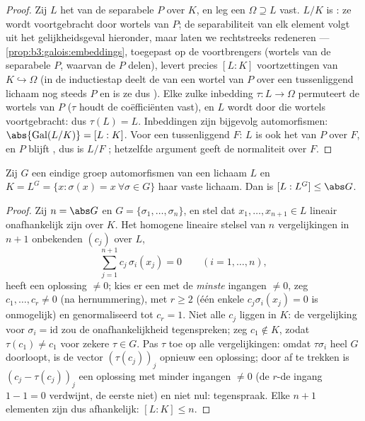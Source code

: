 \begin{proof}
Zij $L$ het  van de separabele $P$ over $K$, en
leg een  $\Omega \supseteq L$ vast. $L/K$
is : ze wordt voortgebracht door wortels van $P$; de
separabiliteit van elk element volgt uit het gelijkheidsgeval
hieronder, maar laten we rechtstreeks redeneren ---
\cref{prop:b3:galois:embeddings}, toegepast op de voortbrengers
(wortels van de separabele $P$, waarvan de  $P$
delen), levert precies $[L:K]$ voortzettingen van $K
\hookrightarrow \Omega$ (in de inductiestap deelt de
 van een wortel van $P$ over een tussenliggend
lichaam nog steeds $P$ en is ze dus ). Elke zulke
inbedding $\tau \colon L \to \Omega$ permuteert de wortels van $P$
($\tau$ houdt de coëfficiënten vast), en $L$ wordt door die
wortels voortgebracht: dus $\tau(L) = L$. Inbeddingen zijn
bijgevolg automorfismen: $\abs{\operatorname{Gal}(L/K)} = [L:K]$.
Voor een tussenliggend $F$: $L$ is ook het  van
$P$ over $F$, en $P$ blijft , dus is $L/F$ ;
hetzelfde argument geeft de normaliteit over $F$.
\end{proof}

\begin{lemma}[Artin]\label{lem:b3:galois:artin}
Zij $G$ een eindige groep automorfismen van een lichaam $L$ en $K
= L^G = \{x : \sigma(x) = x\ \forall\sigma \in G\}$ haar vaste
lichaam. Dan is $[L : L^G] \leq \abs G$.
\end{lemma}

\begin{proof}
Zij $n = \abs G$ en $G = \{\sigma_1, \dots, \sigma_n\}$, en stel
dat $x_1, \dots, x_{n+1} \in L$ lineair onafhankelijk zijn over
$K$. Het homogene lineaire stelsel van $n$ vergelijkingen in $n+1$
onbekenden $(c_j)$ over $L$,
\[
\sum_{j=1}^{n+1} c_j\,\sigma_i(x_j) = 0
\qquad (i = 1, \dots, n),
\]
heeft een oplossing $\neq 0$; kies er een met de \emph{minste}
ingangen $\neq 0$, zeg $c_1, \dots, c_r \neq 0$ (na hernummering),
met $r \geq 2$ (één enkele $c_j\sigma_i(x_j) = 0$ is onmogelijk)
en genormaliseerd tot $c_r = 1$. Niet alle $c_j$ liggen in $K$:
de vergelijking voor $\sigma_i = \mathrm{id}$ zou de
onafhankelijkheid tegenspreken; zeg $c_1 \notin K$, zodat
$\tau(c_1) \ne c_1$ voor zekere $\tau \in G$. Pas $\tau$ toe op
alle vergelijkingen: omdat $\tau\sigma_i$ heel $G$ doorloopt, is
de vector $(\tau(c_j))_j$ opnieuw een oplossing; door af te
trekken is $(c_j - \tau(c_j))_j$ een oplossing met minder
ingangen $\neq 0$ (de $r$-de ingang $1 - 1 = 0$ verdwijnt, de
eerste niet) en niet nul: tegenspraak. Elke $n+1$ elementen zijn
dus afhankelijk: $[L:K] \leq n$.
\end{proof}


